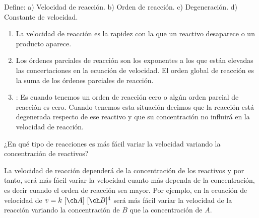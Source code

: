 \begin{question}
    Define: a) Velocidad de reacción.
    b) Orden de reacción.
    c) Degeneración.
    d) Constante de velocidad.


    \begin{solu}

        \begin{enumerate}[label=\letraminuscula]
            \item La velocidad de reacción es la rapidez con la que un reactivo desaparece o un producto aparece.
            \item Los órdenes parciales de reacción son los exponentes a los que están elevadas las concertaciones en la ecuación de velocidad.
            El orden global de reacción es la suma de los órdenes parciales de reacción.
            \item {}: Es cuando tenemos un orden de reacción cero o algún orden parcial de reacción es cero.
            Cuando tenemos esta situación decimos que la reacción está degenerada respecto de ese reactivo y que su concentración no influirá en la velocidad de reacción.
        \end{enumerate}
    \end{solu}
\end{question}

\begin{question}
    ¿En qué tipo de reacciones es más fácil variar la velocidad variando la concentración de reactivos?

    \begin{solu}

        La velocidad de reacción dependerá de la concentración de los reactivos y por tanto, será más fácil variar la velocidad cuanto más dependa de la concentración, es decir cuando el orden de reacción sea mayor. Por ejemplo, en la ecuación de velocidad de $v = k\ \conc{A}\ \conc{B}^4$ será más fácil variar la velocidad de la reacción variando la concentración de $B$ que la concentración de $A$.

    \end{solu}

\end{question}

